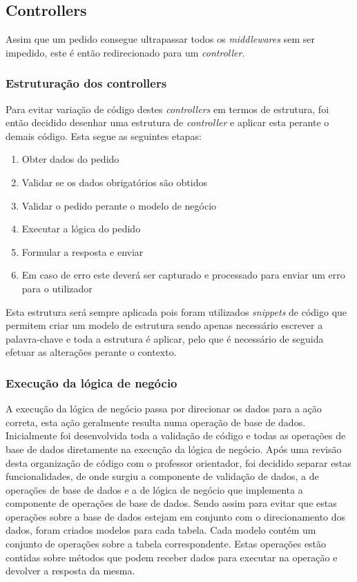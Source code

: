 \subsection{Controllers}
Assim que um pedido consegue ultrapassar todos os \textit{middlewares} sem ser impedido, este é então redirecionado para um \textit{controller}.

\subsubsection{Estruturação dos controllers}
Para evitar variação de código destes \textit{controllers} em termos de estrutura, foi então decidido desenhar uma estrutura de \textit{controller} e aplicar esta perante o demais código. Esta segue as seguintes etapas:
\begin{enumerate}
 \item Obter dados do pedido
 \item Validar se os dados obrigatórios são obtidos
 \item Validar o pedido perante o modelo de negócio
 \item Executar a lógica do pedido
 \item Formular a resposta e enviar
 \item Em caso de erro este deverá ser capturado e processado para enviar um erro para o utilizador
\end{enumerate}

 Esta estrutura será sempre aplicada pois foram utilizados \textit{snippets} de código que permitem criar um modelo de estrutura sendo apenas necessário escrever a palavra-chave e toda a estrutura é aplicar, pelo que é necessário de seguida efetuar as alterações perante o contexto.

\subsubsection{Execução da lógica de negócio}
A execução da lógica de negócio passa por direcionar os dados para a ação correta, esta ação geralmente resulta numa operação de base de dados. Inicialmente foi desenvolvida toda a validação de código e todas as operações de base de dados diretamente na execução da lógica de negócio. Após uma revisão desta organização de código com o professor orientador, foi decidido separar estas funcionalidades, de onde surgiu a componente de validação de dados, a de operações de base de dados e a de lógica de negócio que implementa a componente de operações de base de dados. Sendo assim para evitar que estas operações sobre a base de dados estejam em conjunto com o direcionamento dos dados, foram criados modelos para cada tabela. Cada modelo contém um conjunto de operações sobre a tabela correspondente. Estas operações estão contidas sobre métodos que podem receber dados para executar na operação e devolver a resposta da mesma.


